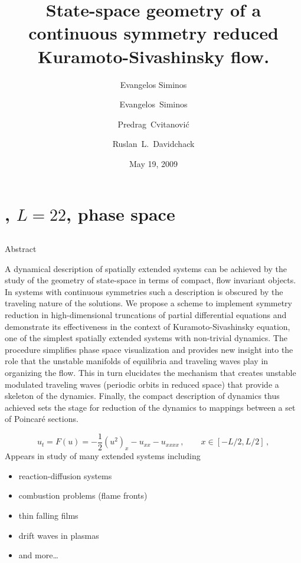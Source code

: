 \documentclass{beamer}
\title{State-space geometry of a continuous symmetry reduced Kuramoto-Sivashinsky flow.}
\author{Evangelos Siminos}
\author[Siminos, Cvitanovi\'c, Davidchack]
{
  \textcolor{green!50!black}{Evangelos~Siminos}\inst{1} \and
  {Predrag~Cvitanovi\'c}\inst{1} \and
  {Ruslan~L.~Davidchack}\inst{2}
}
\institute
{
  \inst{1}%
  Georgia Institute of Technology
  \and
  \vskip-2mm
  \inst{2}%
  University of Leicester, United Kingdom
}
\date{May 19, 2009}
\begin{document}
\begin{frame}
  \titlepage
\end{frame}


\section[\KSe]{\KS, $L=22$, phase space }

\subsection{\KSe}

\begin{frame}{Abstract}

\small{
A dynamical description of spatially extended systems can be achieved by the study of the geometry of state-space in terms of compact, flow invariant objects. In systems with continuous symmetries such a description is obscured by the traveling nature of the solutions. We propose a scheme to implement symmetry reduction in high-dimensional truncations of partial differential equations and demonstrate its effectiveness in the context of Kuramoto-Sivashinsky equation, one of the simplest spatially extended systems with non-trivial dynamics. The procedure simplifies phase space visualization and provides new insight into the role that the unstable manifolds of equilibria and traveling waves play in organizing the flow. This in turn elucidates the mechanism that creates unstable modulated traveling waves (periodic orbits in reduced space) that provide a skeleton of the dynamics. Finally, the compact description of dynamics thus achieved sets the stage for reduction of the dynamics to mappings between a set of Poincar\'e sections.
}

\end{frame}


\begin{frame}{\KSe}
\[
  u_t = F(u) = -{\textstyle\frac{1}{2}}(u^2)_x-u_{xx}-u_{xxxx}
    \,,\qquad   x \in [-L/2,L/2]
    \,,
\]
Appears in study of many extended systems including
\begin{itemize}
 \item reaction-diffusion systems
 \item combustion problems (flame fronts)
 \item thin falling films
 \item drift waves in plasmas
 \item and more\ldots
\end{itemize}

\end{frame}
\end{document}
